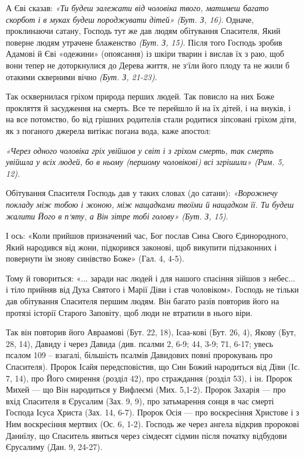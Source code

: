 \documentclass[main.tex]{subfiles}
\begin{document}
А Єві сказав: \emph{{\color{red} «Ти будеш залежати від чоловіка твого, матимеш багато скорбот і в муках будеш породжувати дітей»} (Бут. З, 16)}. Одначе, проклинаючи сатану, Господь тут же дав людям обітування Спасителя, Який поверне людям утрачене блаженство \emph{(Бут. З, 15)}. Після того Господь зробив Адамові й Єві «одежини» (опоясання) із шкіри тварин і вислав їх з раю, щоб вони тепер не доторкнулися до Дерева життя, не з`їли його плоду та не жили б отакими скверними вічно \emph{(Бут. З, 21-23)}.

Так осквернилася гріхом природа перших людей. Так повисло на них Боже прокляття й засудження на смерть. Все те перейшло й на їх дітей, і на внуків, і на все потомство, бо від грішних родителів стали родитися зіпсовані гріхом діти, як з поганого джерела витікає погана вода, каже апостол:
\begin{FlushRight}
    \emph{«Через одного чоловіка гріх увійшов у світ і з гріхом смерть, так смерть увійшла у всіх людей, бо в ньому (першому чоловікові) всі згрішили» (Рим. 5, 12).}
\end{FlushRight}

Обітування Спасителя Господь дав у таких словах (до сатани): \emph{{\color{red} «Ворожнечу покладу між тобою і жоною, між нащадками твоїми й нащадком її. Ти будеш жалити Його в п`яту, а Він зітре тобі голову»} (Бут. З, 15)}.

І ось: «Коли прийшов призначений час, Бог послав Сина Свого Єдинородного, Який народився від жони, підкорився законові, щоб викупити підзаконних і повернути їм знову синівство Боже» (Гал. 4, 4-5).

Тому й говориться: «... заради нас людей і для нашого спасіння зійшов з небес... і тіло прийняв від Духа Святого і Марії Діви і став чоловіком».
Господь не тільки дав обітування Спасителя першим людям. Він багато разів повторив його на протязі історії Старого Заповіту, щоб люди не втратили в нього віри.

Так він повторив його Авраамові (Бут. 22, 18), Ісаа-кові (Бут. 26, 4), Якову (Бут, 28, 14), Давиду і через Давида (див. псалми 2, 6-9; 44, 3-9; 71, 6-17; увесь псалом 109 -- взагалі, більшість псалмів Давидових повні пророкувань про Спасителя). Пророк Ісайя передсповістив, що Син Божий народиться від Діви (Іс. 7, 14), про Його смирення (розділ 42), про страждання (розділ 53), і ін. Пророк Михей — що Він народиться у Вифлеємі (Мих. 5,1-2). Пророк Захарія — про вхід Спасителя в Єрусалим (Зах. 9, 9), про затьмарення сонця в час смерті Господа Ісуса Христа (Зах. 14, 6-7). Пророк Осія — про воскресіння Христове і з Ним воскресіння мертвих (Ос. 6, 1-2). Господь же через ангела відкрив пророкові Даниїлу, що Спаситель явиться через сімдесят сідмин після початку відбудови Єрусалиму (Дан. 9, 24-27).
\end{document}
